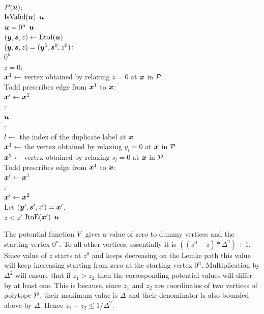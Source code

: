 \begin{algo}
  \underline{$P(\mbox{\boldmath $u$})$}:\+
  \\\IfB \NotB $\mbox{IsValid}(\mbox{\boldmath $u$})$ \ThenB \ReturnB $\mbox{\boldmath $u$}$
  \\\IfB $\mbox{\boldmath $u$}=0^n$ \ThenB \ReturnB $\mbox{\boldmath $u$}$
  \\$(\mbox{\boldmath $y$},\mbox{\boldmath $s$},z) \gets \mbox{EtoI}(\mbox{\boldmath $u$})$
  \\\IfB $(\mbox{\boldmath $y$},\mbox{\boldmath $s$},z)=(\mbox{\boldmath $y$}^0,\mbox{\boldmath $s$}^0,z^0)$:\+
  \\  \ReturnB $0^n$\-
  \\\IfB $z=0$:\+
  \\  $\mbox{\boldmath $x$}^1\gets$ vertex obtained by relaxing $z=0$ at $\mbox{\boldmath $x$}$ in $\mbox{${\mathcal P}$}$
  \\  \IfB Todd \cite{todd1976orientation} prescribes edge from $\mbox{\boldmath $x$}^1$ to $\mbox{\boldmath $x$}$:\+
  \\    $\mbox{\boldmath $x$}'\gets \mbox{\boldmath $x$}^1$\-
  \\  \ElseB:\+
  \\    \ReturnB $\mbox{\boldmath $u$}$\-\-
  \\\ElseB:\+
  \\  $l\gets$ the index of the duplicate label at $\mbox{\boldmath $x$}$
  \\  $\mbox{\boldmath $x$}^1\gets$ the vertex obtained by relaxing $y_l=0$ at $\mbox{\boldmath $x$}$ in $\mbox{${\mathcal P}$}$
  \\  $\mbox{\boldmath $x$}^2\gets $ vertex obtained by relaxing $s_l=0$ at $\mbox{\boldmath $x$}$ in $\mbox{${\mathcal P}$}$
  \\  \IfB Todd \cite{todd1976orientation} prescribes edge from $\mbox{\boldmath $x$}^1$ to $\mbox{\boldmath $x$}$:\+
  \\    $\mbox{\boldmath $x$}'\gets\mbox{\boldmath $x$}^1$\-
  \\  \ElseB:\+
  \\    $\mbox{\boldmath $x$}'\gets \mbox{\boldmath $x$}^2$\-\-
  \\Let $(\mbox{\boldmath $y$}',\mbox{\boldmath $s$}',z') = \mbox{\boldmath $x$}'$.
  \\\IfB $z<z'$ \ThenB \ReturnB $\mbox{ItoE}(\mbox{\boldmath $x$}')$ \ElseB \ReturnB $\mbox{\boldmath $u$}$
\end{algo}

The potential function $\mbox{$V$}$ gives a value of zero to dummy vertices and the starting vertex $0^n$. To all
other vertices, essentially it is $((z^0-z) * \Delta^2)+1$. Since value of $z$
starts at $z^0$ and keeps decreasing on the Lemke path this value will keep
increasing starting from zero at the starting vertex $0^n$. Multiplication by
$\Delta^2$ will ensure that if $z_1>z_2$ then the corresponding potential values 
will differ by at least one. This is because, since $z_1$ and $z_2$ are 
coordinates of two vertices of polytope $\mbox{${\mathcal P}$}$, their maximum value is $\Delta$
and their denominator is also bounded above by $\Delta$. Hence $z_1-z_2\le
1/\Delta^2$. 

